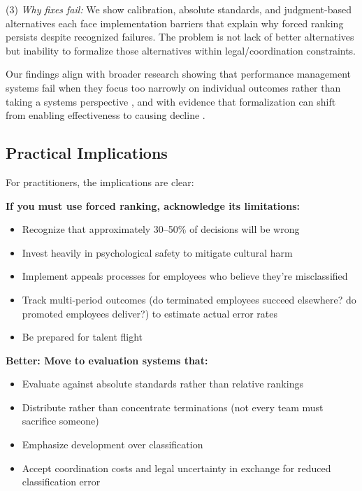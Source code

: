 \documentclass[12pt]{article}
\begin{document}
(3) \emph{Why fixes fail:} We show calibration, absolute standards, and judgment-based alternatives each face implementation barriers that explain why forced ranking persists despite recognized failures. The problem is not lack of better alternatives but inability to formalize those alternatives within legal/coordination constraints.

Our findings align with broader research showing that performance management systems fail when they focus too narrowly on individual outcomes rather than taking a systems perspective \citep{schleicher2018putting, schleicher2019evaluating}, and with evidence that formalization can shift from enabling effectiveness to causing decline \citep{walsh1987formalization}.

\subsection{Practical Implications}

For practitioners, the implications are clear:

\textbf{If you must use forced ranking, acknowledge its limitations:}
\begin{itemize}
\item Recognize that approximately 30--50\% of decisions will be wrong
\item Invest heavily in psychological safety to mitigate cultural harm
\item Implement appeals processes for employees who believe they're misclassified
\item Track multi-period outcomes (do terminated employees succeed elsewhere? do promoted employees deliver?) to estimate actual error rates
\item Be prepared for talent flight
\end{itemize}

\textbf{Better: Move to evaluation systems that:}
\begin{itemize}
\item Evaluate against absolute standards rather than relative rankings
\item Distribute rather than concentrate terminations (not every team must sacrifice someone)
\item Emphasize development over classification
\item Accept coordination costs and legal uncertainty in exchange for reduced classification error
\end{itemize}
\end{document}
